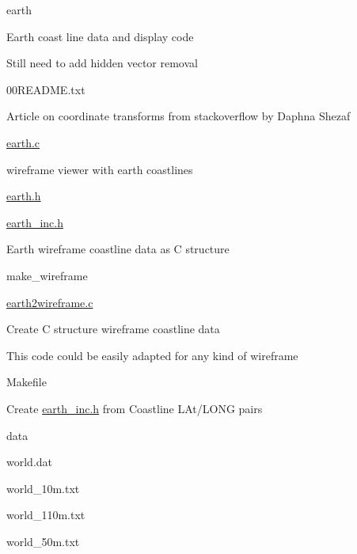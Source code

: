 \begin{DoxyItemize}
\item earth
\begin{DoxyItemize}
\item Earth coast line data and display code
\item Still need to add hidden vector removal
\begin{DoxyItemize}
\item 00\-R\-E\-A\-D\-M\-E.\-txt
\begin{DoxyItemize}
\item Article on coordinate transforms from stackoverflow by Daphna Shezaf
\end{DoxyItemize}
\item \hyperlink{earth_8c}{earth.\-c}
\begin{DoxyItemize}
\item wireframe viewer with earth coastlines
\end{DoxyItemize}
\item \hyperlink{earth_8h}{earth.\-h}
\item \hyperlink{earth__inc_8h}{earth\-\_\-inc.\-h}
\begin{DoxyItemize}
\item Earth wireframe coastline data as C structure
\end{DoxyItemize}
\item make\-\_\-wireframe
\begin{DoxyItemize}
\item \hyperlink{earth2wireframe_8c}{earth2wireframe.\-c}
\begin{DoxyItemize}
\item Create C structure wireframe coastline data
\item This code could be easily adapted for any kind of wireframe
\end{DoxyItemize}
\item Makefile
\begin{DoxyItemize}
\item Create \hyperlink{earth__inc_8h}{earth\-\_\-inc.\-h} from Coastline L\-At/\-L\-O\-N\-G pairs
\end{DoxyItemize}
\item data
\begin{DoxyItemize}
\item world.\-dat
\item world\-\_\-10m.\-txt
\item world\-\_\-110m.\-txt
\item world\-\_\-50m.\-txt
\begin{DoxyItemize}

\end{DoxyItemize}
\end{DoxyItemize}
\end{DoxyItemize}
\end{DoxyItemize}
\end{DoxyItemize}
\end{DoxyItemize}

